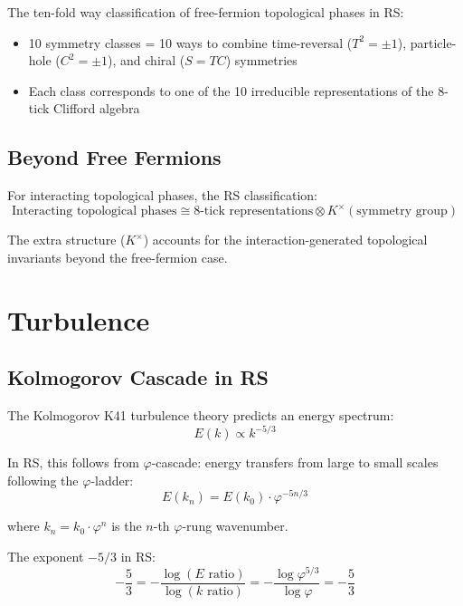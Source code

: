 \documentclass[12pt,a4paper]{article}
\theoremstyle{definition}
\theoremstyle{remark}
\begin{document}
The ten-fold way classification of free-fermion topological phases in RS:
\begin{itemize}
\item 10 symmetry classes = 10 ways to combine time-reversal ($T^2 = \pm 1$), 
particle-hole ($C^2 = \pm 1$), and chiral ($S = TC$) symmetries
\item Each class corresponds to one of the 10 irreducible representations of the 
8-tick Clifford algebra
\end{itemize}

\subsection{Beyond Free Fermions}

For interacting topological phases, the RS classification:
\begin{equation}
\text{Interacting topological phases} \cong \text{8-tick representations} \otimes K^\times(\text{symmetry group})
\end{equation}

The extra structure ($K^\times$) accounts for the interaction-generated topological 
invariants beyond the free-fermion case.

\section{Turbulence}

\subsection{Kolmogorov Cascade in RS}

The Kolmogorov K41 turbulence theory predicts an energy spectrum:
\begin{equation}
E(k) \propto k^{-5/3}
\end{equation}

In RS, this follows from $\varphi$-cascade: energy transfers from large to small 
scales following the $\varphi$-ladder:
\begin{equation}
E(k_n) = E(k_0) \cdot \varphi^{-5n/3}
\end{equation}

where $k_n = k_0 \cdot \varphi^n$ is the $n$-th $\varphi$-rung wavenumber.

The exponent $-5/3$ in RS:
\begin{equation}
-\frac{5}{3} = -\frac{\log(E \text{ ratio})}{\log(k \text{ ratio})} = -\frac{\log \varphi^{5/3}}{\log \varphi} = -\frac{5}{3}
\end{equation}
\end{document}
